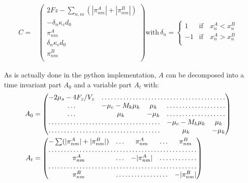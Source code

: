 \documentclass[a4paper,12pt]{article}
\begin{document}
\begin{equation}
\begin{aligned}
    C = &%
    \begin{pmatrix}
      2Fz - \sum_{n,m}(|\pi_{nm}^A| + |\pi_{nm}^B|) \\
      - \delta_n \kappa_c d_0\\
      \pi_{nm}^A\\
      \delta_n \kappa_c d_0\\
      \pi_{nm}^B\\
    \end{pmatrix}
    \mathrm{with}\, \delta_n =%
    \begin{cases}
      1  &\mathrm{if}\quad  x_n^A < x_n^B\\
      -1 &\mathrm{if}\quad  x_n^A > x_n^B\\
    \end{cases}
\end{aligned}
\end{equation}

As is actually done in the python implementation, 
$A$  can be decomposed into a time invariant part $A_0$ and a
variable part $A_t$ with:\\
\begin{equation}
  \begin{aligned}
    A_0 &=%
    \begin{pmatrix}
      - 2 \mu_s - 4 F_z/V_z & \hdotsfor{4}\\
      \hdots &  -\mu_c - M_k \mu_k& \mu_k & \hdotsfor{2}\\
      \hdots & \mu_k & - \mu_k & \hdotsfor{2}\\
      \hdotsfor{3} & -\mu_c - M_k \mu_k & \mu_k\\
      \hdotsfor{3} & \mu_k & - \mu_k\\
    \end{pmatrix}\\
    A_t &=%
    \begin{pmatrix}
      - \sum (|\pi_{nm}^A| + |\pi_{nm}^B|)& \hdots & \pi_{nm}^A &%
      \hdots &  \pi_{nm}^B\\
      \hdotsfor{5}\\
      \pi_{nm}^A & \hdots & - |\pi_{nm}^A| & \hdotsfor{2}\\
      \hdotsfor{5}\\
      \pi_{nm}^B & \hdotsfor{3} & - |\pi_{nm}^B| \\
    \end{pmatrix}\\
  \end{aligned}
\end{equation}
\end{document}
